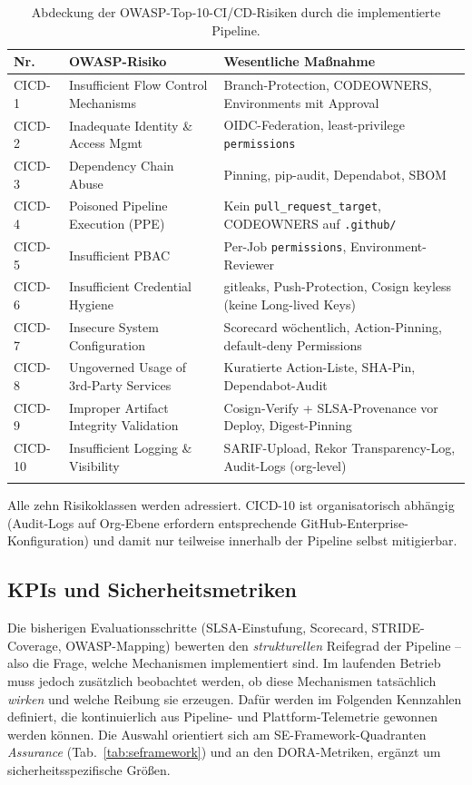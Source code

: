 \documentclass[12pt, a4paper]{scrartcl}
\begin{document}
\begin{longtable}{p{0.9cm} p{4.8cm} p{8.2cm}}
\toprule
\textbf{Nr.} & \textbf{OWASP-Risiko} & \textbf{Wesentliche Maßnahme} \\
\midrule \endhead
CICD-1 & Insufficient Flow Control Mechanisms & Branch-Protection, CODEOWNERS, Environments mit Approval \\
CICD-2 & Inadequate Identity \& Access Mgmt    & OIDC-Federation, least-privilege \texttt{permissions} \\
CICD-3 & Dependency Chain Abuse                & Pinning, pip-audit, Dependabot, SBOM \\
CICD-4 & Poisoned Pipeline Execution (PPE)     & Kein \texttt{pull\_request\_target}, CODEOWNERS auf \texttt{.github/} \\
CICD-5 & Insufficient PBAC                     & Per-Job \texttt{permissions}, Environment-Reviewer \\
CICD-6 & Insufficient Credential Hygiene       & gitleaks, Push-Protection, Cosign keyless (keine Long-lived Keys) \\
CICD-7 & Insecure System Configuration         & Scorecard wöchentlich, Action-Pinning, default-deny Permissions \\
CICD-8 & Ungoverned Usage of 3rd-Party Services & Kuratierte Action-Liste, SHA-Pin, Dependabot-Audit \\
CICD-9 & Improper Artifact Integrity Validation & Cosign-Verify + SLSA-Provenance vor Deploy, Digest-Pinning \\
CICD-10 & Insufficient Logging \& Visibility   & SARIF-Upload, Rekor Transparency-Log, Audit-Logs (org-level) \\
\bottomrule
\caption{Abdeckung der OWASP-Top-10-CI/CD-Risiken durch die
implementierte Pipeline.}
\label{tab:owasp}
\end{longtable}

Alle zehn Risikoklassen werden adressiert. CICD-10 ist organisatorisch
abhängig (Audit-Logs auf Org-Ebene erfordern entsprechende
GitHub-Enterprise-Konfiguration) und damit nur teilweise innerhalb der
Pipeline selbst mitigierbar.

\subsection{KPIs und Sicherheitsmetriken}\label{sec:kpis}
Die bisherigen Evaluationsschritte (SLSA-Einstufung, Scorecard,
STRIDE-Coverage, OWASP-Mapping) bewerten den \emph{strukturellen}
Reifegrad der Pipeline -- also die Frage, welche Mechanismen
implementiert sind. Im laufenden Betrieb muss jedoch zusätzlich
beobachtet werden, ob diese Mechanismen tatsächlich \emph{wirken} und
welche Reibung sie erzeugen. Dafür werden im Folgenden Kennzahlen
definiert, die kontinuierlich aus Pipeline- und Plattform-Telemetrie
gewonnen werden können. Die Auswahl orientiert sich am
SE-Framework-Quadranten \emph{Assurance} (Tab.~\ref{tab:seframework})
und an den DORA-Metriken, ergänzt um sicherheits\-spezifische Größen.
\end{document}
